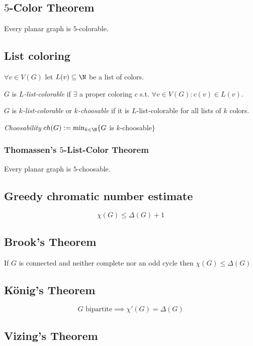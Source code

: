 \subsection*{$5$-Color Theorem}

Every planar graph is $5$-colorable.

\subsection*{List coloring}

$\forall v \in V(G)$ let $L(v) \subseteq \N$ be a list of colors.

$G$ is \emph{$L$-list-colorable} if $\exists$ a proper coloring $c$ s.t. $\forall v \in V(G) : c(v) \in L(v)$.

\spacing

$G$ is \emph{$k$-list-colorable} or \emph{$k$-choosable} if it is $L$-list-colorable for all lists of $k$ colors.

\spacing

\emph{Choosability} $ch(G) := \min_{k\in\N}\{ G$ is $k$-choosable$\}$

\subsubsection*{Thomassen's $5$-List-Color Theorem}

Every planar graph is $5$-choosable.

\subsection*{Greedy chromatic number estimate}

$$\chi(G) \leq \Delta(G)+1$$

\subsection*{Brook's Theorem}

If $G$ is connected and neither complete nor an odd cycle then $\chi(G) \leq \Delta(G)$

\subsection*{König's Theorem}

$$G \text{ bipartite} \implies \chi'(G) = \Delta(G)$$

\subsection*{Vizing's Theorem}

